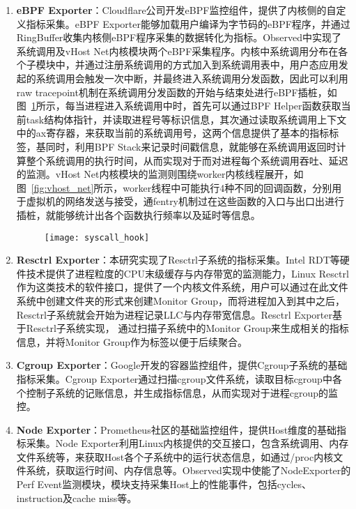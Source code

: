 \begin{enumerate}
    \item \textbf{eBPF Exporter}：Cloudflare公司开发eBPF监控组件，提供了内核侧的自定义指标采集。eBPF Exporter能够加载用户编译为字节码的eBPF程序，并通过RingBuffer收集内核侧eBPF程序采集的数据转化为指标。Observed中实现了系统调用及vHost Net内核模块两个eBPF采集程序。内核中系统调用分布在各个子模块中，并通过注册系统调用的方式加入到系统调用表中，用户态应用发起的系统调用会触发一次中断，并最终进入系统调用分发函数，因此可以利用raw tracepoint机制在系统调用分发函数的开始与结束处进行eBPF插桩，如图~\ref{fig:syscall_hook}所示，每当进程进入系统调用中时，首先可以通过BPF Helper函数获取当前task结构体指针，并读取进程号等标识信息，其次通过读取系统调用上下文中的ax寄存器，来获取当前的系统调用号，这两个信息提供了基本的指标标签，基同时，利用BPF Stack来记录时间戳信息，就能够在系统调用返回时计算整个系统调用的执行时间，从而实现对于而对进程每个系统调用吞吐、延迟的监测。vHost Net内核模块的监测则围绕worker内核线程展开，如图~\ref{fig:vhost_net}所示，worker线程中可能执行4种不同的回调函数，分别用于虚拟机的网络发送与接受，通fentry机制过在这些函数的入口与出口出进行插桩，就能够统计出各个函数执行频率以及延时等信息。

    \begin{figure}[H]
        \centering
        \texttt{[image: syscall\_hook]}
        \label{fig:syscall_hook}
    \end{figure}

    \item \textbf{Resctrl Exporter}：本研究实现了Resctrl子系统的指标采集。Intel RDT等硬件技术提供了进程粒度的CPU末级缓存与内存带宽的监测能力，Linux Resctrl作为这类技术的软件接口，提供了一个内核文件系统，用户可以通过在此文件系统中创建文件夹的形式来创建Monitor Group，而将进程加入到其中之后，Resctrl子系统就会开始为进程记录LLC与内存带宽信息。Resctrl Exporter基于Resctrl子系统实现， 通过扫描子系统中的Monitor Group来生成相关的指标信息，并将Monitor Group作为标签以便于后续聚合。
    
    \item \textbf{Cgroup Exporter}：Google开发的容器监控组件，提供Cgroup子系统的基础指标采集。Cgroup Exporter通过扫描cgroup文件系统，读取目标cgroup中各个控制子系统的记账信息，并生成指标信息，从而实现对于进程cgroup的监控。
    
    \item \textbf{Node Exporter}：Prometheus社区的基础监控组件，提供Host维度的基础指标采集。Node Exporter利用Linux内核提供的交互接口，包含系统调用、内存文件系统等，来获取Host各个子系统中的运行状态信息，如通过/proc内核文件系统，获取运行时间、内存信息等。Observed实现中使能了NodeExporter的Perf Event监测模块，模块支持采集Host上的性能事件，包括cycles、instruction及cache miss等。

\end{enumerate}

